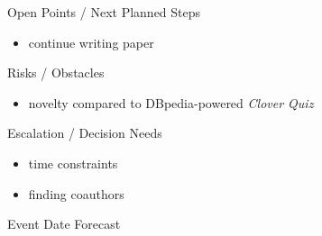 \documentclass[]{kiesgrube}
\begin{document}
\begin{poster}
\begin{posterbox}[name=open,column=1,row=0]{Open Points / Next Planned Steps}
\begin{itemize}
\item continue writing paper
\end{itemize}
\end{posterbox}
\begin{posterbox}[name=risks,column=1,below=open]{Risks / Obstacles}
\begin{itemize}
\item novelty compared to DBpedia-powered \emph{Clover Quiz}
\end{itemize}
\end{posterbox}
\begin{posterbox}[name=escalation,column=1,below=risks]{Escalation / Decision Needs}
\begin{itemize}
\item time constraints 
\item finding coauthors 
\end{itemize}
\end{posterbox}
\begin{posterbox}[name=event,below=escalation,column=1]{Event Date Forecast}
\end{posterbox}


\end{poster}
\end{document}
